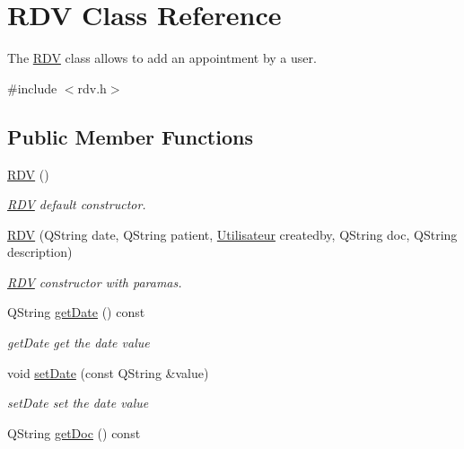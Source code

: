 \hypertarget{class_r_d_v}{}\section{R\+DV Class Reference}
\label{class_r_d_v}


The \mbox{\hyperlink{class_r_d_v}{R\+DV}} class allows to add an appointment by a user.  




{\ttfamily \#include $<$rdv.\+h$>$}

\subsection*{Public Member Functions}
\begin{DoxyCompactItemize}
\item 
\mbox{\label{class_r_d_v_a23c36b9f8a7c2001775b39571bb32d70}} 
\mbox{\hyperlink{class_r_d_v_a23c36b9f8a7c2001775b39571bb32d70}{R\+DV}} ()
\begin{DoxyCompactList}\small\item\em \mbox{\hyperlink{class_r_d_v}{R\+DV}} default constructor. \end{DoxyCompactList}\item 
\mbox{\hyperlink{class_r_d_v_adeb5f93f4c88e3d6e87043287f083d9f}{R\+DV}} (Q\+String date, Q\+String patient, \mbox{\hyperlink{class_utilisateur}{Utilisateur}} createdby, Q\+String doc, Q\+String description)
\begin{DoxyCompactList}\small\item\em \mbox{\hyperlink{class_r_d_v}{R\+DV}} constructor with paramas. \end{DoxyCompactList}\item 
Q\+String \mbox{\hyperlink{class_r_d_v_a9645f641f76ba6dde15c00704e637fc3}{get\+Date}} () const
\begin{DoxyCompactList}\small\item\em get\+Date get the date value \end{DoxyCompactList}\item 
void \mbox{\hyperlink{class_r_d_v_a33de832512fc2d6542ea961efadf3be4}{set\+Date}} (const Q\+String \&value)
\begin{DoxyCompactList}\small\item\em set\+Date set the date value \end{DoxyCompactList}\item 
Q\+String \mbox{\hyperlink{class_r_d_v_aab057819a02d3257b3f419a569c5e968}{get\+Doc}} () const

\end{DoxyCompactItemize}

